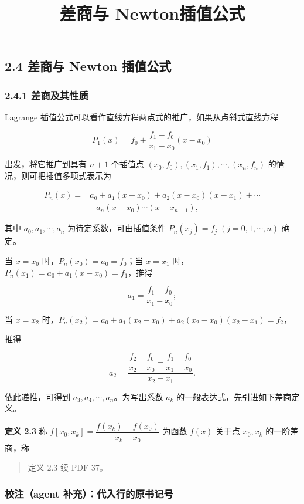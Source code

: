 \documentclass[
  10pt,
  fontset=fandol]{ctexart}
\title{差商与 Newton插值公式}
\author{}
\date{}
\begin{document}
\maketitle

\subsection{2.4 差商与 Newton 插值公式}\label{ux5deeux5546ux4e0e-newton-ux63d2ux503cux516cux5f0f}

\subsubsection{2.4.1 差商及其性质}\label{ux5deeux5546ux53caux5176ux6027ux8d28}

Lagrange 插值公式可以看作直线方程两点式的推广，如果从点斜式直线方程

\[
P_1(x)=f_0+\frac{f_1-f_0}{x_1-x_0}(x-x_0)
\]

出发，将它推广到具有 \(n+1\) 个插值点 \((x_0,\allowbreak f_0),\allowbreak (x_1,\allowbreak f_1),\allowbreak \cdots,\allowbreak (x_n,\allowbreak f_n)\) 的情况，则可把插值多项式表示为

\[
\begin{aligned}
P_n(x)={}&a_0+a_1(x-x_0)+a_2(x-x_0)(x-x_1)+\cdots\\
&+a_n(x-x_0)\cdots(x-x_{n-1}),
\end{aligned}
\tag{2.4.1}
\]

其中 \(a_0,a_1,\cdots,a_n\) 为待定系数，可由插值条件 \(P_n(x_j)=f_j\;(j=0,1,\cdots,n)\) 确定。

当 \(x=x_0\) 时，\(P_n(x_0)=a_0=f_0\)；当 \(x=x_1\) 时，\(P_n(x_1)=a_0+a_1(x-x_0)=f_1\)，推得

\[
a_1=\frac{f_1-f_0}{x_1-x_0};
\]

当 \(x=x_2\) 时，\(P_n(x_2)=a_0+a_1(x_2-x_0)+a_2(x_2-x_0)(x_2-x_1)=f_2\)，

推得

\[
a_2=\frac{\dfrac{f_2-f_0}{x_2-x_0}-\dfrac{f_1-f_0}{x_1-x_0}}{x_2-x_1}.
\]

依此递推，可得到 \(a_3,a_4,\cdots,a_n\)。为写出系数 \(a_k\) 的一般表达式，先引进如下差商定义。

\textbf{定义 2.3} 称 \(f[x_0,x_k]=\dfrac{f(x_k)-f(x_0)}{x_k-x_0}\) 为函数 \(f(x)\) 关于点 \(x_0,x_k\) 的一阶差商，称

\begin{quote}
定义 2.3 续 PDF 37。
\end{quote}

\subsubsection{校注（agent 补充）：代入行的原书记号}\label{ux6821ux6ce8agent-ux8865ux5145ux4ee3ux5165ux884cux7684ux539fux4e66ux8bb0ux53f7}
\end{document}
